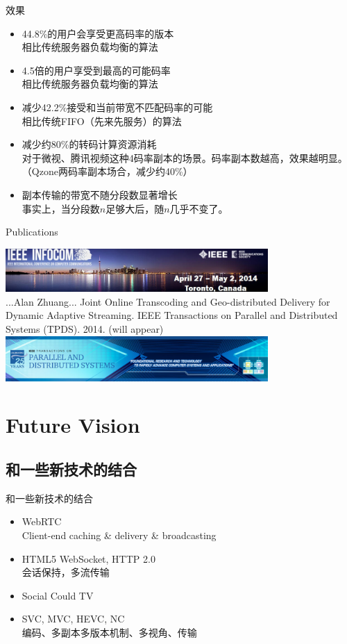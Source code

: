 \documentclass{beamer}
\begin{document}
\begin{frame}{效果}
\begin{itemize}
\item 44.8\%的用户会享受更高码率的版本\\
	相比传统服务器负载均衡的算法
\item 4.5倍的用户享受到最高的可能码率\\
	相比传统服务器负载均衡的算法
\item 减少42.2\%接受和当前带宽不匹配码率的可能\\
	相比传统FIFO（先来先服务）的算法
\item 减少约80\%的转码计算资源消耗\\
	对于微视、腾讯视频这种4码率副本的场景。码率副本数越高，效果越明显。（Qzone两码率副本场合，减少约40\%）
\item 副本传输的带宽不随分段数显著增长\\
	事实上，当分段数$n$足够大后，随$n$几乎不变了。
\end{itemize}
\end{frame}
\begin{frame}{Publications}
\begin{center}
\includegraphics[width=10cm]{fig/infocom.jpg}\\\pause
...Alan Zhuang... Joint Online Transcoding and Geo-distributed Delivery for Dynamic Adaptive Streaming. IEEE Transactions on Parallel and Distributed Systems (TPDS). 2014. (will appear)\\\pause
\includegraphics[width=10cm]{fig/tpds_25yr.jpg}\\\pause
\end{center}
\end{frame}

\section{Future Vision}
\subsection{和一些新技术的结合}
\begin{frame}{和一些新技术的结合}
\begin{itemize}
\item WebRTC\\
Client-end caching \& delivery \& broadcasting
\item HTML5 WebSocket, HTTP 2.0\\
会话保持，多流传输
\item Social Could TV\\
\item SVC, MVC, HEVC, NC\\
编码、多副本多版本机制、多视角、传输
\end{itemize}
\end{frame}
\end{document}
